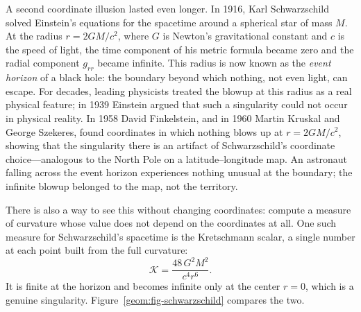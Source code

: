 A second coordinate illusion lasted even longer. In 1916, Karl Schwarzschild solved Einstein's equations for the spacetime around a spherical star of mass $M$. At the radius $r = 2GM/c^2$, where $G$ is Newton's gravitational constant and $c$ is the speed of light, the time component of his metric formula became zero and the radial component $g_{rr}$ became infinite. This radius is now known as the \emph{event horizon} of a black hole: the boundary beyond which nothing, not even light, can escape. For decades, leading physicists treated the blowup at this radius as a real physical feature; in 1939 Einstein argued that such a singularity could not occur in physical reality. In 1958 David Finkelstein, and in 1960 Martin Kruskal and George Szekeres, found coordinates in which nothing blows up at $r = 2GM/c^2$, showing that the singularity there is an artifact of Schwarzschild's coordinate choice---analogous to the North Pole on a latitude--longitude map. An astronaut falling across the event horizon experiences nothing unusual at the boundary; the infinite blowup belonged to the map, not the territory.

There is also a way to see this without changing coordinates: compute a measure of curvature whose value does not depend on the coordinates at all. One such measure for Schwarzschild's spacetime is the Kretschmann scalar, a single number at each point built from the full curvature:
\[
\mathcal{K} = \frac{48\,G^2M^2}{c^4 r^6}.
\]
It is finite at the horizon and becomes infinite only at the center $r = 0$, which is a genuine singularity. Figure~\ref{geom:fig-schwarzschild} compares the two.


